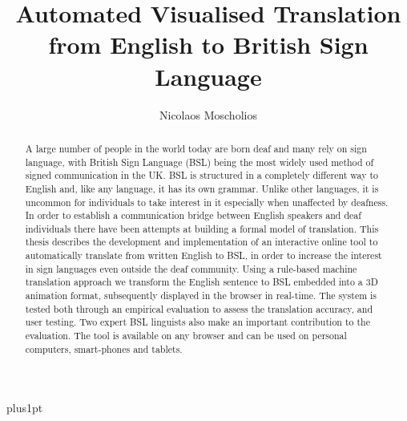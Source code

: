 \documentclass[12pt]{ociamthesis}  %
\title{\fontsize{22}{23}\selectfont Automated Visualised Translation from English to British Sign Language}
\author{Nicolaos Moscholios}             %
\begin{document}
\baselineskip=18pt plus1pt

\maketitle                  %

\newpage
\vspace*{\fill}

\begin{abstract}
A large number of people in the world today are born deaf and many rely on sign language, with  British Sign Language (BSL) being the most widely used method of signed communication in the UK. BSL is structured in a completely different way to English and, like any language, it has its own grammar. Unlike other languages, it is uncommon for individuals to take interest in it especially when unaffected by deafness. In order to establish a communication bridge between English speakers and deaf individuals there have been attempts at building a formal model of translation. This thesis describes the development and implementation of an interactive online tool to automatically  translate from written English to BSL, in order to increase the interest in sign languages even outside the deaf community. Using a rule-based machine translation approach we transform the English sentence to BSL embedded into a 3D animation format, subsequently displayed in the browser in real-time. The system is tested both through an empirical evaluation to assess the translation accuracy, and user testing. Two expert BSL linguists also make an important contribution to the evaluation. The tool is available on any browser and can be used on personal computers, smart-phones and tablets.
\end{abstract}
\end{document}
